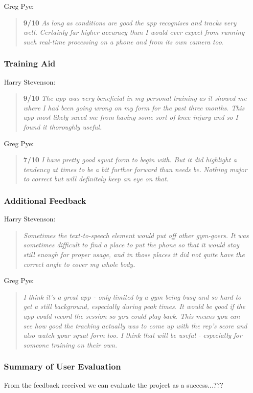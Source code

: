 Greg Pye:
\begin{quote}
\textbf{9/10} \emph{As long as conditions are good the app recognises and tracks very well. Certainly far higher accuracy than I would ever expect from running such real-time processing on a phone and from its own camera too.}
\end{quote}

\subsubsection{Training Aid}

Harry Stevenson:
\begin{quote}
\textbf{9/10} \emph{The app was very beneficial in my personal training as it showed me where I had been going wrong on my form for the past three months. This app most likely saved me from having some sort of knee injury and so I found it thoroughly useful.}
\end{quote}

Greg Pye:
\begin{quote}
\textbf{7/10} \emph{I have pretty good squat form to begin with. But it did highlight a tendency at times to be a bit further forward than needs be. Nothing major to correct but will definitely keep an eye on that.}
\end{quote}

\subsubsection{Additional Feedback}

Harry Stevenson:
\begin{quote}
\emph{Sometimes the text-to-speech element would put off other gym-goers. It was sometimes difficult to find a place to put the phone so that it would stay still enough for proper usage, and in those places it did not quite have the correct angle to cover my whole body.}
\end{quote}

Greg Pye:
\begin{quote}
\emph{I think it's a great app - only limited by a gym being busy and so hard to get a still background, especially during peak times. It would be good if the app could record the session so you could play back. This means you can see how good the tracking actually was to come up with the rep's score and also watch your squat form too. I think that will be useful - especially for someone training on their own.}
\end{quote}

\subsubsection{Summary of User Evaluation}

From the feedback received we can evaluate the project as a success...???